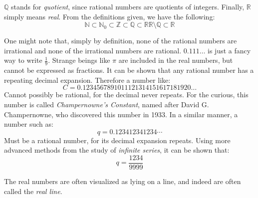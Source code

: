 \documentclass[crop=false,class=book,oneside]{standalone}                      %
\begin{document}
        $\mathbb{Q}$ stands for \textit{quotient}, since
        rational numbers are quotients of integers. Finally,
        $\mathbb{R}$ simply means \textit{real}.
        From the definitions given, we have the
        following:
        \begin{subequations}
            \begin{equation}
                \mathbb{N}
                \subset\mathbb{N}_{0}
                \subset\mathbb{Z}
                \subset\mathbb{Q}
                \subset\mathbb{R}
            \end{equation}
            \begin{equation}
                \mathbb{R}\setminus\mathbb{Q}
                \subset\mathbb{R}
            \end{equation}
        \end{subequations}
        \begin{remark}
            One might note that, simply by definition, none of the
            rational numbers are irrational and none of the
            irrational numbers are rational.
            $0.111\hdots$ is just a fancy way to write $\frac{1}{9}$.
            Strange beings like $\pi$ are included in the real numbers,
            but cannot be expressed as fractions. It can be shown that
            any rational number has a repeating decimal expansion.
            Therefore a number like:
            \begin{equation}
                C=0.1234567891011121314151617181920\dots
            \end{equation}
            Cannot possibly be rational, for the decimal never repeats.
            For the curious, this number is called
            \textit{Champernowne's Constant}, named after David
            G. Champernowne, who discovered this number in 1933.
            In a similar manner, a number such as:
            \begin{equation}
                q=0.123412341234\cdots
            \end{equation}
            Must be a rational number, for its decimal expansion
            repeats. Using more advanced methods from the study
            of \textit{infinite series}, it can be shown that:
            \begin{equation}
                q=\frac{1234}{9999}
            \end{equation}
        \end{remark}
        The real numbers are often visualized as lying on a
        line, and indeed are often called the \textit{real line}.
\end{document}

